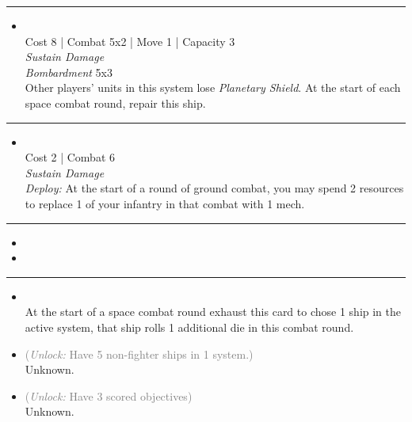 \begin{multicols}{2}
\vspace{-10pt}\rule{\hsize}{0.4pt}\vspace{5pt}


\begin{itemize}
\item {}\\
Cost 8 | Combat 5x2 | Move 1 | Capacity 3 \\
\emph{Sustain Damage}\\
\emph{Bombardment} 5x3\\
Other players' units in this system lose \emph{Planetary Shield}. At the start of each space combat round, repair this ship.
\end{itemize}

\vspace{-10pt}\rule{\hsize}{0.4pt}\vspace{5pt}


\begin{itemize}
\item {}
\\
Cost 2 | Combat 6 \\
\emph{Sustain Damage}\\
\emph{Deploy:} At the start of a round of ground combat, you may spend 2 resources to replace 1 of your infantry in that combat with 1 mech.
\end{itemize}

\vspace{-10pt}\rule{\hsize}{0.4pt}\vspace{5pt}

\nounits

\columnbreak
{}

\begin{itemize}
\item \disruptors
\item \NES
\end{itemize}

\vspace{-10pt}\rule{\hsize}{0.4pt}\vspace{5pt}


\begin{itemize}
\item {}\\
At the start of a space combat round exhaust this card to chose 1 ship in the active system, that ship rolls 1 additional die in this combat round.
\item {} \textcolor{gray}{(\emph{Unlock:} Have 5 non-fighter ships in 1 system.)}\\
Unknown.
\item {} \textcolor{gray}{(\emph{Unlock:} Have 3 scored objectives)}\\
Unknown.
\end{itemize}


\end{multicols}
